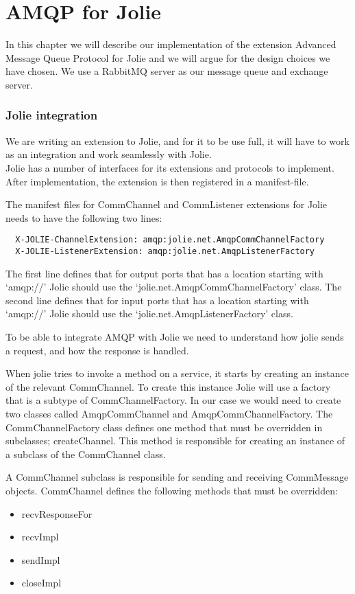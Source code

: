 \section{AMQP for Jolie}
In this chapter we will describe our implementation of the extension Advanced Message Queue Protocol for Jolie and we will argue for the design choices we have chosen. We use a RabbitMQ\cite{RabbitMQ} server as our message queue and exchange server.
\subsubsection{Jolie integration}
We are writing an extension to Jolie, and for it to be use full, it will have to work as an integration and work seamlessly with Jolie.\\
Jolie has a number of interfaces for its extensions and protocols to implement. After implementation, the extension is then registered in a manifest-file.

The manifest files for CommChannel and CommListener extensions for Jolie needs to have the following two lines:
\begin{lstlisting}
  X-JOLIE-ChannelExtension: amqp:jolie.net.AmqpCommChannelFactory
  X-JOLIE-ListenerExtension: amqp:jolie.net.AmqpListenerFactory
\end{lstlisting}
The first line defines that for output ports that has a location starting with `amqp://' Jolie should use the `jolie.net.AmqpCommChannelFactory' class.
The second line defines that for input ports that has a location starting with `amqp://' Jolie should use the `jolie.net.AmqpListenerFactory' class.

To be able to integrate AMQP with Jolie we need to understand how jolie sends a request, and how the response is handled.

When jolie tries to invoke a method on a service, it starts by creating an instance of the relevant CommChannel. To create this instance Jolie will use a factory that is a subtype of CommChannelFactory. In our case we would need to create two classes called AmqpCommChannel and AmqpCommChannelFactory. The CommChannelFactory class defines one method that must be overridden in subclasses; createChannel. This method is responsible for creating an instance of a subclass of the CommChannel class.

A CommChannel subclass is responsible for sending and receiving CommMessage objects. CommChannel defines the following methods that must be overridden:
\begin{itemize}
  \item{recvResponseFor}
  \item{recvImpl}
  \item{sendImpl}
  \item{closeImpl}
\end{itemize}

